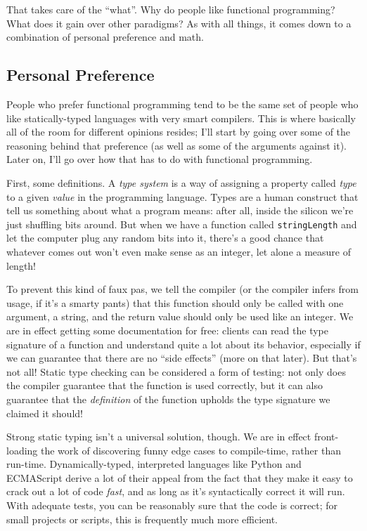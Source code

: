 \documentclass{book}
\newcommand{\mlil}[1]{\lstinline[language=pseudoml,columns=fixed]|#1|}\usepackage{caption}
\begin{document}
That takes care of the ``what''. Why do people like functional programming? What does it gain over other paradigms? As with all things, it comes down to a combination of personal preference and math.

\subsection{Personal Preference}

People who prefer functional programming tend to be the same set of people who like statically-typed languages with very smart compilers. This is where basically all of the room for different opinions resides; I'll start by going over some of the reasoning behind that preference (as well as some of the arguments against it). Later on, I'll go over how that has to do with functional programming.

First, some definitions. A \emph{type system} is a way of assigning a property called \emph{type} to a given \emph{value} in the programming language. Types are a human construct that tell us something about what a program means: after all, inside the silicon we're just shuffling bits around. But when we have a function called \mlil{stringLength} and let the computer plug any random bits into it, there's a good chance that whatever comes out won't even make sense as an integer, let alone a measure of length!

To prevent this kind of faux pas, we tell the compiler (or the compiler infers from usage, if it's a smarty pants) that this function should only be called with one argument, a string, and the return value should only be used like an integer. We are in effect getting some documentation for free: clients can read the type signature of a function and understand quite a lot about its behavior, especially if we can guarantee that there are no ``side effects'' (more on that later). But that's not all! Static type checking can be considered a form of testing: not only does the compiler guarantee that the function is used correctly, but it can also guarantee that the \emph{definition} of the function upholds the type signature we claimed it should!

Strong static typing isn't a universal solution, though. We are in effect front-loading the work of discovering funny edge cases to compile-time, rather than run-time. Dynamically-typed, interpreted languages like Python and ECMAScript derive a lot of their appeal from the fact that they make it easy to crack out a lot of code \emph{fast}, and as long as it's syntactically correct it will run. With adequate tests, you can be reasonably sure that the code is correct; for small projects or scripts, this is frequently much more efficient.
\end{document}
